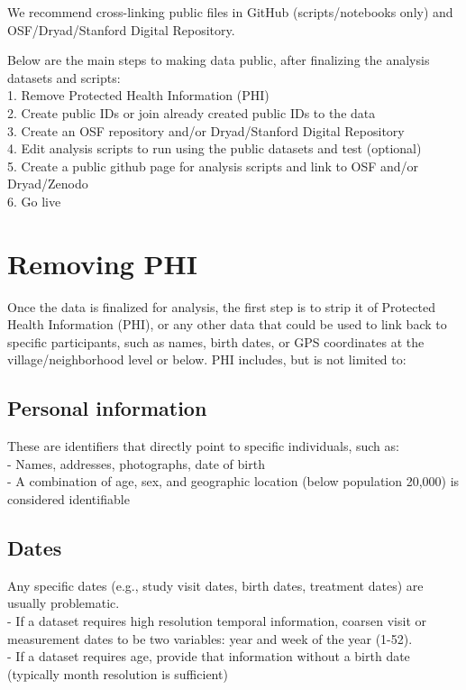 \documentclass[
]{book}
\begin{document}
We recommend cross-linking public files in GitHub (scripts/notebooks only) and OSF/Dryad/Stanford Digital Repository.

Below are the main steps to making data public, after finalizing the analysis datasets and scripts:\\
1. Remove Protected Health Information (PHI)\\
2. Create public IDs or join already created public IDs to the data\\
3. Create an OSF repository and/or Dryad/Stanford Digital Repository\\
4. Edit analysis scripts to run using the public datasets and test (optional)\\
5. Create a public github page for analysis scripts and link to OSF and/or Dryad/Zenodo\\
6. Go live

\section{Removing PHI}\label{removing-phi}

Once the data is finalized for analysis, the first step is to strip it of Protected Health Information (PHI), or any other data that could be used to link back to specific participants, such as names, birth dates, or GPS coordinates at the village/neighborhood level or below. PHI includes, but is not limited to:

\subsection{Personal information}\label{personal-information}

These are identifiers that directly point to specific individuals, such as:\\
- Names, addresses, photographs, date of birth\\
- A combination of age, sex, and geographic location (below population 20,000) is considered identifiable

\subsection{Dates}\label{dates}

Any specific dates (e.g., study visit dates, birth dates, treatment dates) are usually problematic.\\
- If a dataset requires high resolution temporal information, coarsen visit or measurement dates to be two variables: year and week of the year (1-52).\\
- If a dataset requires age, provide that information without a birth date (typically month resolution is sufficient)
\end{document}
